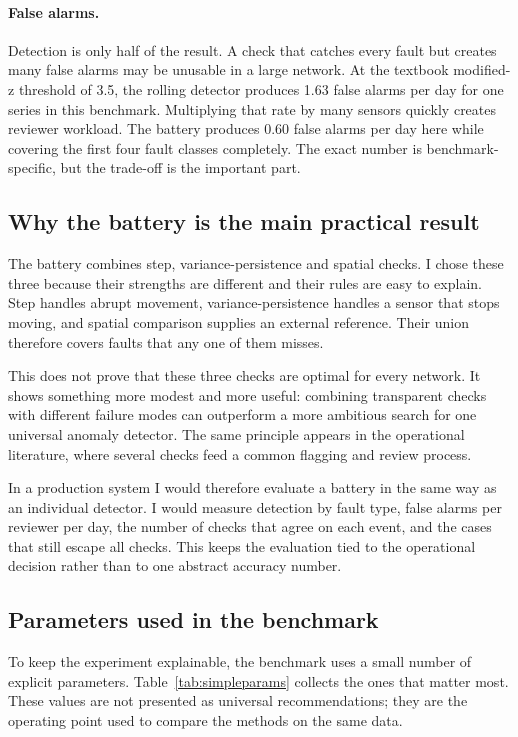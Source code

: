 \paragraph{False alarms.}
Detection is only half of the result. A check that catches every fault but
creates many false alarms may be unusable in a large network. At the
textbook modified-z threshold of 3.5, the rolling detector produces 1.63
false alarms per day for one series in this benchmark. Multiplying that rate
by many sensors quickly creates reviewer workload. The battery produces 0.60
false alarms per day here while covering the first four fault classes
completely. The exact number is benchmark-specific, but the trade-off is the
important part.

\subsection{Why the battery is the main practical result}

The battery combines step, variance-persistence and spatial checks. I chose
these three because their strengths are different and their rules are easy
to explain. Step handles abrupt movement, variance-persistence handles a
sensor that stops moving, and spatial comparison supplies an external
reference. Their union therefore covers faults that any one of them misses.

This does not prove that these three checks are optimal for every network.
It shows something more modest and more useful: combining transparent checks
with different failure modes can outperform a more ambitious search for one
universal anomaly detector. The same principle appears in the operational
literature, where several checks feed a common flagging and review process.

In a production system I would therefore evaluate a battery in the same way
as an individual detector. I would measure detection by fault type, false
alarms per reviewer per day, the number of checks that agree on each event,
and the cases that still escape all checks. This keeps the evaluation tied
to the operational decision rather than to one abstract accuracy number.


\subsection{Parameters used in the benchmark}

To keep the experiment explainable, the benchmark uses a small number of
explicit parameters. Table~\ref{tab:simpleparams} collects the ones that
matter most. These values are not presented as universal recommendations;
they are the operating point used to compare the methods on the same data.

